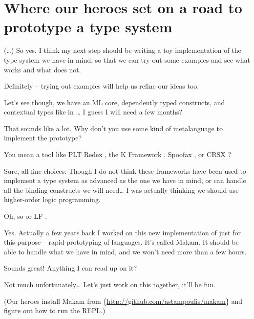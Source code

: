 \section{Where our heroes set on a road to prototype a type
system}\label{where-our-heroes-set-on-a-road-to-prototype-a-type-system}

 (\ldots{}) So yes, I think my next step should be writing a toy
implementation of the type system we have in mind, so that we can try
out some examples and see what works and what does not.

 Definitely -- trying out examples will help us refine our ideas
too.

 Let's see though, we have an ML core, dependently typed
constructs, and contextual types like in
\citet{nanevski2008contextual}\ldots{} I guess I will need a few months?

 That sounds like a lot. Why don't you use some kind of
metalanguage to implement the prototype?

 You mean a tool like PLT Redex \citep{felleisen2009semantics},
the K Framework \citep{rosu2010overview,ellison2009rewriting}, Spoofax
\citep{kats2010spoofax}, or CRSX \citep{rose2011crsx}?

 Sure, all fine choices. Though I do not think these frameworks
have been used to implement a type system as advanced as the one we have
in mind, or can handle all the binding constructs we will need\ldots{} I
was actually thinking we should use higher-order logic programming.

 Oh, so \lamprolog \citep{miller1988overview} or LF
\citep{pfenning1999system}.

 Yes. Actually a few years back I worked on this new
implementation of \lamprolog
just for this purpose -- rapid prototyping of languages. It's called
Makam. It should be able to handle what we have in mind, and we won't
need more than a few hours.

 Sounds great! Anything I can read up on it?

 Not much unfortunately\ldots{} Let's just work on this
together, it'll be fun.

(Our heroes install Makam from
\if@ACM@anonymous\{\url{http://github.com/astampoulis/makam}\}\fi\xspace
and figure out how to run the REPL.)
